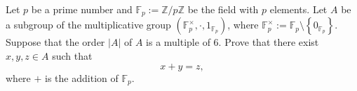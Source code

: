 \begin{problem}
    Let \( p \) be a prime number and \( \mathbb{F}_{p} := \mathbb{Z}/p\mathbb{Z} \) be the field with \( p \) elements. Let \( A \) be a subgroup of the multiplicative group \( \left(\mathbb{F}_{p}^{\times}, \cdot, 1_{\mathbb{F}_{p}}\right) \), where \( \mathbb{F}_{p}^{\times} := \mathbb{F}_{p} \setminus \left\{ 0_{\mathbb{F}_{p}} \right\} \). Suppose that the order \( \left| A \right| \) of \( A \) is a multiple of \( 6 \). Prove that there exist \( x, y, z \in A \) such that
    \[
        x + y = z,
    \]
    where \( + \) is the addition of \( \mathbb{F}_{p} \).
\end{problem}
